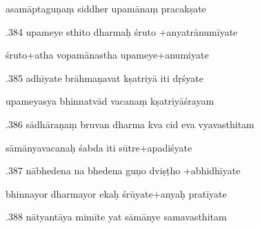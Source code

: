 \documentclass[article,12pt,a4paper]{memoir}%
\newcounter{parCount}
\begin{document}
	  
	  \pstart \leavevmode%
	asamāptaguṇaṃ siddher upamānaṃ pracakṣate 
	{}
	\pend%
      

	  
	  \pstart {}.384 upameye sthito dharmaḥ śruto +anyatrānumīyate 
	{}
	\pend%
      

	  
	  \pstart \leavevmode%
	śruto+atha vopamānastha upameye+anumiyate 
	{}
	\pend%
      

	  
	  \pstart {}.385 adhīyate brāhmaṇavat kṣatriyā iti dṛśyate 
	{}
	\pend%
      

	  
	  \pstart \leavevmode%
	upameyasya bhinnatvād vacanaṃ kṣatriyāśrayam 
	{}
	\pend%
      

	  
	  \pstart {}.386 sādhāraṇaṃ bruvan dharma kva cid eva vyavasthitam 
	{}
	\pend%
      

	  
	  \pstart \leavevmode%
	sāmānyavacanaḥ śabda iti sūtre+apadiśyate 
	{}
	\pend%
      

	  
	  \pstart {}.387 nābhedena na bhedena guṇo dviṣṭho +abhidhīyate 
	{}
	\pend%
      

	  
	  \pstart \leavevmode%
	bhinnayor dharmayor ekaḥ śrūyate+anyaḥ pratīyate 
	{}
	\pend%
      

	  
	  \pstart {}.388 nātyantāya mimīte yat sāmānye samavasthitam 
	{}
	\pend%
      
\end{document}

